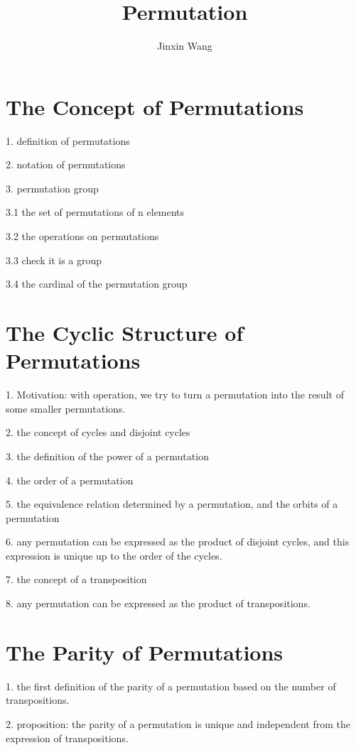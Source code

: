 \documentclass{ctexart}
\title{Permutation}
\author{Jinxin Wang}
\date{}
\begin{document}
\maketitle

\section{The Concept of Permutations}

1. definition of permutations

2. notation of permutations

3. permutation group

3.1 the set of permutations of n elements

3.2 the operations on permutations

3.3 check it is a group

3.4 the cardinal of the permutation group

\section{The Cyclic Structure of Permutations}

1. Motivation: with operation, we try to turn a permutation into the result of 
some smaller permutations.

2. the concept of cycles and disjoint cycles

3. the definition of the power of a permutation

4. the order of a permutation

5. the equivalence relation determined by a permutation, and the orbits of a 
permutation

6. any permutation can be expressed as the product of disjoint cycles, and this 
expression is unique up to the order of the cycles.

7. the concept of a transposition

8. any permutation can be expressed as the product of transpositions.

\section{The Parity of Permutations}

1. the first definition of the parity of a permutation based on the number of 
transpositions.

2. proposition: the parity of a permutation is unique and independent from the 
expression of transpositions.
\end{document}
